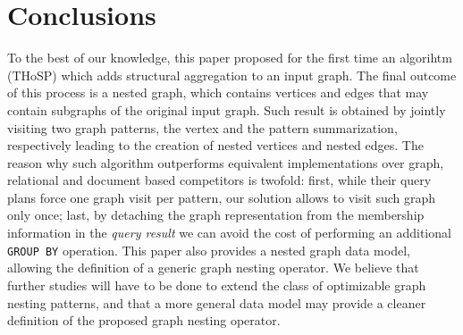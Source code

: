 \section{Conclusions}
To the best of our knowledge, this paper proposed for the first time an algorihtm (THoSP) which adds structural aggregation to an input graph. The final outcome of this process is a nested graph, which contains vertices and edges that may contain subgraphs of the original input graph. Such result is obtained by jointly visiting two graph patterns, the vertex and the pattern summarization, respectively leading to the creation of nested vertices and nested edges. The reason why such algorithm outperforms equivalent implementations over graph, relational and document based competitors is twofold: first, while their query plans force one graph visit per pattern, our solution allows to visit such graph only once; last, by detaching the graph representation from the membership information in the \textit{query result} we can avoid the cost of performing an additional \texttt{GROUP BY} operation. This paper also provides a nested graph data model, allowing the definition of a generic graph nesting operator.
We believe that further studies will have to be done to extend the class of optimizable graph nesting patterns, and that a more general data model may provide a cleaner definition of the proposed graph nesting operator. 
